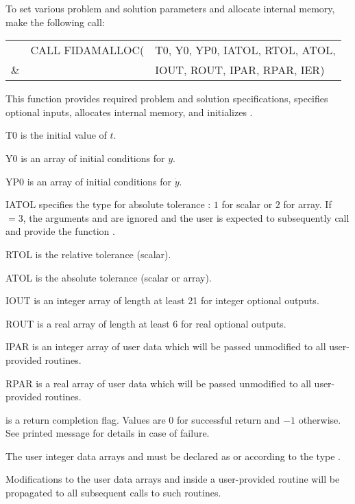 \begin{Steps}
  To set various problem and solution parameters and allocate
  internal memory, make the following call:
  {
    \begin{tabular}[t]{@{}r@{}l@{}l}
        &CALL FIDAMALLOC(&T0, Y0, YP0, IATOL, RTOL, ATOL,  \\
    {\&}&                &IOUT, ROUT, IPAR, RPAR, IER)
  \end{tabular}
  }
  {
    This function provides required problem and solution specifications, 
    specifies optional inputs,
    allocates internal memory, and initializes {\ida}.
  }
  {
    \begin{args}[IATOL]
    \item[T0] is the initial value of $t$.
    \item[Y0] is an array of initial conditions for $y$.
    \item[YP0] is an array of initial conditions for $\dot{y}$.
    \item[IATOL] specifies the type for absolute tolerance :
      $1$ for scalar or $2$ for array. If $=3$, the arguments
       and  are ignored and the user is expected to
      subsequently call  and provide the function .
    \item[RTOL] is the relative tolerance (scalar).
    \item[ATOL] is the absolute tolerance (scalar or array).
    \item[IOUT] is an integer array of length at least 21 for integer optional
                outputs.
    \item[ROUT] is a real array of length at least 6 for real optional outputs.
    \item[IPAR] is an integer array of user data which will be passed
      unmodified to all user-provided routines.
    \item[RPAR] is a real array of user data which will be passed
      unmodified to all user-provided routines.
    \end{args}
  }
  {
     is a return completion flag.  Values are $0$ for successful return
    and $-1$ otherwise. See printed message for details in case of failure.
  }
  {
    The user integer data arrays  and  must be declared as
     or  according to the {\CC} type .

    Modifications to the user data arrays  and  inside a 
    user-provided routine will be propagated to all subsequent calls to
    such routines.

}
\end{Steps}
